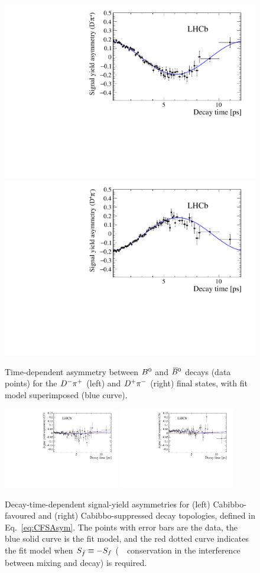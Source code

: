 \begin{figure}[htpb]
  \begin{center}
    \includegraphics[width=0.49\linewidth]{05DecaytimeFit/figs/datafit/Asymmetry_f.pdf}
    \includegraphics[width=0.49\linewidth]{05DecaytimeFit/figs/datafit/Asymmetry_fbar.pdf}
  \end{center}
  \vspace{-4mm}
  \caption{Time-dependent asymmetry between $B^0$ and $\kern 0.18em\overline{\kern -0.18em B}{}^0$ decays (data points) for the $D^-\pi^+$ (left) and $D^+\pi^-$ (right) final states, with fit model superimposed (blue curve).}
  \label{fig:asymplot}
\end{figure}
\begin{figure}[t]
  \includegraphics[width=0.45\textwidth]{05DecaytimeFit/figs/datafit/SAsymmetry_CF.pdf}
  \includegraphics[width=0.45\textwidth]{05DecaytimeFit/figs/datafit/SAsymmetry_CS.pdf}
\vspace{-2mm}
\caption{\label{fig:asymmetries} Decay-time-dependent signal-yield asymmetries
for (left) Cabibbo-favoured and (right) Cabibbo-suppressed decay topologies, defined in Eq.~\ref{eq:CFSAsym}. 
The points with error bars are the data,
the blue solid curve is the fit model, and the red dotted curve indicates the fit model when
$\mbox{\ensuremath{S_{\bar{f}}}}\equiv -\mbox{\ensuremath{S_f}}$ (\ie~\CP~conservation in the interference between mixing and decay) is required.}
\end{figure}

